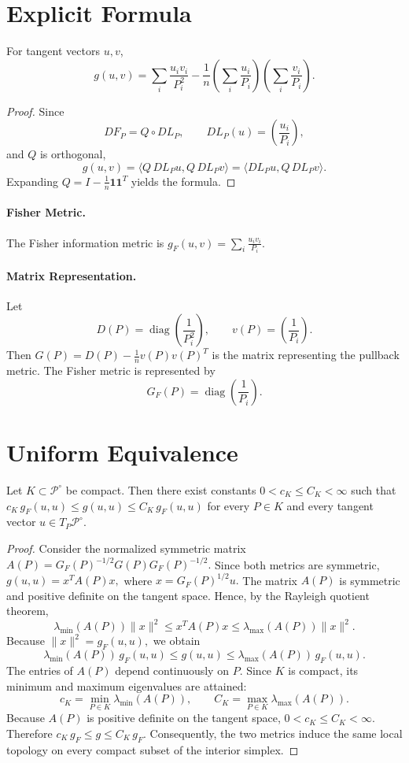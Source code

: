 \section{Explicit Formula}\label{ch:sec:explicit-formula}
\begin{proposition}
\label{ch:prop:25-2}
For tangent vectors \(u,v\),
\[ g(u,v) = \sum_i\frac{u_iv_i}{P_i^2} -
\frac1n
\left(\sum_i\frac{u_i}{P_i}\right)
\left(\sum_i\frac{v_i}{P_i}\right). \]
\end{proposition}
\begin{proof}
Since
\[ DF_P=Q\circ DL_P, \qquad
DL_P(u)=\left(\frac{u_i}{P_i}\right), \]
and \(Q\) is orthogonal,
\[ g(u,v) = \langle Q\,DL_P u,Q\,DL_P v\rangle =
\langle DL_P u,Q\,DL_P v\rangle. \]
Expanding \(Q=I-\frac1n\mathbf{11}^T\) yields the formula. 
\end{proof}
\paragraph{Fisher Metric.}
The Fisher information metric is
$g_F(u,v) = \sum_i\frac{u_iv_i}{P_i}.$

\paragraph{Matrix Representation.}
Let
\[
D(P)=\operatorname{diag}\!\left(\frac1{P_i^2}\right),
\qquad v(P)=\left(\frac1{P_i}\right).
\]
Then
$G(P) = D(P)-\frac1n v(P)v(P)^T$
is the matrix representing the pullback metric.
The Fisher metric is represented by
\[
G_F(P)=\operatorname{diag}\!\left(\frac1{P_i}\right).
\]

\section{Uniform Equivalence}\label{ch:sec:uniform-equivalence}
\begin{theorem}
\label{ch:thm:25-3}
Let \(K\subset\mathcal P^\circ\) be compact.
Then there exist constants
$0<c_K\le C_K<\infty$
such that
$c_K\,g_F(u,u) \le g(u,u) \le C_K\,g_F(u,u)$
for every \(P\in K\) and every tangent vector
\(u\in T_P\mathcal P^\circ\).
\end{theorem}
\begin{proof}
Consider the normalized symmetric matrix
$A(P) = G_F(P)^{-1/2} G(P) G_F(P)^{-1/2}.$
Since both metrics are symmetric,
$g(u,u) = x^T A(P) x,$
where
$x = G_F(P)^{1/2}u.$
The matrix \(A(P)\) is symmetric and positive definite on the tangent
space. Hence, by the Rayleigh quotient theorem,
\[ \lambda_{\min}(A(P)) \|x\|^2 \le x^T A(P) x
\le \lambda_{\max}(A(P)) \|x\|^2. \]
Because
$\|x\|^2 = g_F(u,u),$
we obtain
\[ \lambda_{\min}(A(P))\,g_F(u,u) \le g(u,u)
\le \lambda_{\max}(A(P))\,g_F(u,u). \]
The entries of \(A(P)\) depend continuously on \(P\). Since \(K\) is compact,
its minimum and maximum eigenvalues are attained:
\[ c_K =
\min_{P\in K}\lambda_{\min}(A(P)),
\qquad C_K =
\max_{P\in K}\lambda_{\max}(A(P)). \]
Because \(A(P)\) is positive definite on the tangent space,
$0<c_K\le C_K<\infty.$
Therefore
$c_K\,g_F \le g \le C_K\,g_F.$
Consequently, the two metrics induce the same local topology on every
compact subset of the interior simplex. 
\end{proof}
